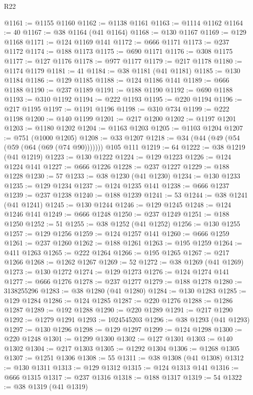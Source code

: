 \begin{lexlean}{R22}
\begin{coremodule}
@1161 := @1155 @1160
@1162 := @1138 @1161
@1163 := @1114 @1162
@1164 := 40
@1167 := @38 @1164 (@41 @1164)
@1168 := @130 @1167
@1169 := @129 @1168
@1171 := @124 @1169 @141
@1172 := @666 @1171
@1173 := @237 @1172
@1174 := @188 @1173
@1175 := @690 @1171
@1176 := @308 @1175
@1177 := @127 @1176
@1178 := @977 @1177
@1179 := @217 @1178
@1180 := @1174 @1179
@1181 := 41
@1184 := @38 @1181 (@41 @1181)
@1185 := @130 @1184
@1186 := @129 @1185
@1188 := @124 @1186 @141
@1189 := @666 @1188
@1190 := @237 @1189
@1191 := @188 @1190
@1192 := @690 @1188
@1193 := @310 @1192
@1194 := @222 @1193
@1195 := @220 @1194
@1196 := @217 @1195
@1197 := @1191 @1196
@1198 := @310 @734
@1199 := @222 @1198
@1200 := @140 @1199
@1201 := @217 @1200
@1202 := @1197 @1201
@1203 := @1180 @1202
@1204 := @1163 @1203
@1205 := @1103 @1204
@1207 := @751 (@1000 @1205)
@1208 := @33 @1207
@1218 := @34 (@44 (@49 (@54 (@59 (@64 (@69 (@74 @90))))))) @105 @111
@1219 := 64
@1222 := @38 @1219 (@41 @1219)
@1223 := @130 @1222
@1224 := @129 @1223
@1226 := @124 @1224 @141
@1227 := @666 @1226
@1228 := @237 @1227
@1229 := @188 @1228
@1230 := 57
@1233 := @38 @1230 (@41 @1230)
@1234 := @130 @1233
@1235 := @129 @1234
@1237 := @124 @1235 @141
@1238 := @666 @1237
@1239 := @237 @1238
@1240 := @188 @1239
@1241 := 53
@1244 := @38 @1241 (@41 @1241)
@1245 := @130 @1244
@1246 := @129 @1245
@1248 := @124 @1246 @141
@1249 := @666 @1248
@1250 := @237 @1249
@1251 := @188 @1250
@1252 := 51
@1255 := @38 @1252 (@41 @1252)
@1256 := @130 @1255
@1257 := @129 @1256
@1259 := @124 @1257 @141
@1260 := @666 @1259
@1261 := @237 @1260
@1262 := @188 @1261
@1263 := @195 @1259
@1264 := @411 @1263
@1265 := @222 @1264
@1266 := @195 @1265
@1267 := @217 @1266
@1268 := @1262 @1267
@1269 := 52
@1272 := @38 @1269 (@41 @1269)
@1273 := @130 @1272
@1274 := @129 @1273
@1276 := @124 @1274 @141
@1277 := @666 @1276
@1278 := @237 @1277
@1279 := @188 @1278
@1280 := 3138255296
@1283 := @38 @1280 (@41 @1280)
@1284 := @130 @1283
@1285 := @129 @1284
@1286 := @124 @1285
@1287 := @220 @1276
@1288 := @1286 @1287
@1289 := @192 @1288
@1290 := @220 @1289
@1291 := @217 @1290
@1292 := @1279 @1291
@1293 := 1024545203
@1296 := @38 @1293 (@41 @1293)
@1297 := @130 @1296
@1298 := @129 @1297
@1299 := @124 @1298
@1300 := @220 @1248
@1301 := @1299 @1300
@1302 := @127 @1301
@1303 := @140 @1302
@1304 := @217 @1303
@1305 := @1292 @1304
@1306 := @1268 @1305
@1307 := @1251 @1306
@1308 := 55
@1311 := @38 @1308 (@41 @1308)
@1312 := @130 @1311
@1313 := @129 @1312
@1315 := @124 @1313 @141
@1316 := @666 @1315
@1317 := @237 @1316
@1318 := @188 @1317
@1319 := 54
@1322 := @38 @1319 (@41 @1319)

\end{coremodule}
\end{lexlean}
